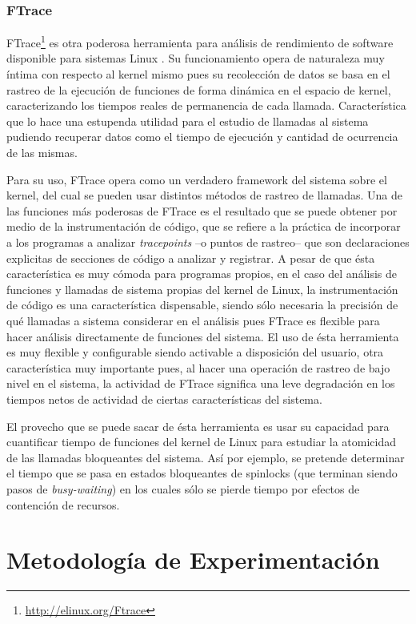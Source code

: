 \subsubsection{FTrace}
FTrace\footnote{\url{http://elinux.org/Ftrace}} es otra poderosa herramienta para análisis de rendimiento de software disponible para sistemas Linux \cite{paper:FTraceSony}. Su funcionamiento opera de naturaleza muy íntima con respecto al kernel mismo pues su recolección de datos se basa en el rastreo de la ejecución de funciones de forma dinámica en el espacio de kernel, caracterizando los tiempos reales de permanencia de cada llamada. Característica que lo hace una estupenda utilidad para el estudio de llamadas al sistema pudiendo recuperar datos como el tiempo de ejecución y cantidad de ocurrencia de las mismas.

Para su uso, FTrace opera como un verdadero framework del sistema sobre el kernel, del cual se pueden usar distintos métodos de rastreo de llamadas. Una de las funciones más poderosas de FTrace es el resultado que se puede obtener por medio de la instrumentación de código, que se refiere a la práctica de incorporar a los programas a analizar \emph{tracepoints} --o puntos de rastreo-- que son declaraciones explicitas de secciones de código a analizar y registrar. A pesar de que ésta característica es muy cómoda para programas propios, en el caso del análisis de funciones y llamadas de sistema propias del kernel de Linux, la instrumentación de código es una característica dispensable, siendo sólo necesaria la precisión de qué llamadas a sistema considerar en el análisis pues FTrace es flexible para hacer análisis directamente de funciones del sistema. El uso de ésta herramienta es muy flexible y configurable siendo activable a disposición del usuario, otra característica muy importante pues, al hacer una operación de rastreo de bajo nivel en el sistema, la actividad de FTrace significa una leve degradación en los tiempos netos de actividad de ciertas características del sistema.

El provecho que se puede sacar de ésta herramienta es usar su capacidad para cuantificar tiempo de funciones del kernel de Linux para estudiar la atomicidad de las llamadas bloqueantes del sistema. Así por ejemplo, se pretende determinar el tiempo que se pasa en estados bloqueantes de spinlocks (que terminan siendo pasos de \emph{busy-waiting}) en los cuales sólo se pierde tiempo por efectos de contención de recursos.

\section{Metodología de Experimentación}

